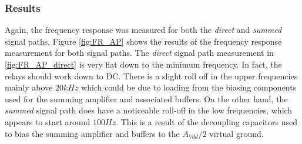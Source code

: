 		\subsubsection{Results}

		Again, the frequency response was measured for both the \emph{direct} and \emph{summed} signal paths.  Figure \ref{fig:FR_AP} shows the results of the frequency response measurement for both signal paths.  The \emph{direct} signal path measurement in \ref{fig:FR_AP_direct} is very flat down to the minimum frequency.  In fact, the relays should work down to DC.  There is a slight roll off in the upper frequencies mainly above $20kHz$ which could be due to loading from the biasing components used for the summing amplifier and associated buffers.  On the other hand, the \emph{summed} signal path does have a noticeable roll-off in the low frequencies, which appears to start around $100Hz$.  This is a result of the decoupling capacitors used to bias the summing amplifier and buffers to the $A_{Vdd}/2$ virtual ground.


